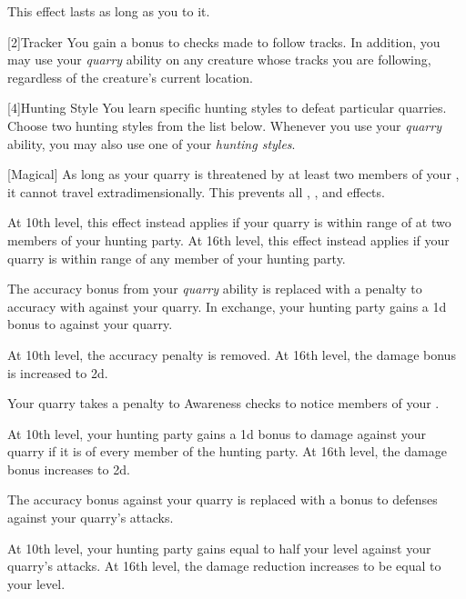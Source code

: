        This effect lasts as long as you  to it.

        [2]{Tracker}
        You gain a  bonus to checks made to follow tracks.
        In addition, you may use your \textit{quarry} ability on any creature whose tracks you are following, regardless of the creature's current location.

        [4]{Hunting Style}
        You learn specific hunting styles to defeat particular quarries.
        Choose two hunting styles from the list below.
        Whenever you use your \textit{quarry} ability, you may also use one of your \textit{hunting styles}.
        {
            [Magical]
            As long as your quarry is threatened by at least two members of your , it cannot travel extradimensionally.
            This prevents all , , and  effects.
            \par At 10th level, this effect instead applies if your quarry is within \rngmed range of at two members of your hunting party.
            At 16th level, this effect instead applies if your quarry is within \rnglong range of any member of your hunting party.

            The accuracy bonus from your \textit{quarry} ability is replaced with a  penalty to accuracy with  against your quarry.
            In exchange, your hunting party gains a \plus1d bonus to  against your quarry.
            \par At 10th level, the accuracy penalty is removed.
            At 16th level, the damage bonus is increased to \plus2d.

            Your quarry takes a  penalty to Awareness checks to notice members of your .
            \par At 10th level, your hunting party gains a \plus1d bonus to damage against your quarry if it is \unaware of every member of the hunting party.
            At 16th level, the damage bonus increases to \plus2d.

            The accuracy bonus against your quarry is replaced with a  bonus to defenses against your quarry's attacks.
            \par At 10th level, your hunting party gains  equal to half your level against your quarry's attacks.
            At 16th level, the damage reduction increases to be equal to your level.

}
